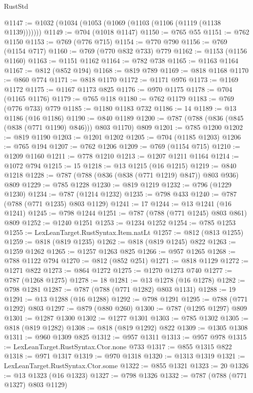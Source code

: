 \begin{lexlean}{RustStd}
\begin{coremodule}
@1147 := @1032 (@1034 (@1053 (@1069 (@1103 (@1106 (@1119 (@1138 @1139)))))))
@1149 := @704 (@1018 @1147)
@1150 := @765 @55
@1151 := @762 @1150
@1153 := @769 (@776 @715)
@1154 := @770 @790
@1156 := @769 (@1154 @717)
@1160 := @769 (@770 @832 @733) @779
@1162 := @1153 (@1156 @1160)
@1163 := @1151 @1162
@1164 := @782 @738
@1165 := @1163 @1164
@1167 := @812 (@852 @194)
@1168 := @819 @789
@1169 := @818 @1168
@1170 := @860 @774
@1171 := @818 @1170
@1172 := @1171 @976
@1173 := @1169 @1172
@1175 := @1167 @1173 @825
@1176 := @970 @1175
@1178 := @704 (@1165 @1176)
@1179 := @765 @118
@1180 := @762 @1179
@1183 := @769 (@776 @733) @779
@1185 := @1180 @1183 @732
@1186 := 14
@1189 := @13 @1186 (@16 @1186)
@1190 := @840 @1189
@1200 := @787 (@788 (@836 (@845 (@838 (@771 @1190) @846))) @803 @1170) @809
@1201 := @785 @1200
@1202 := @819 @1190
@1203 := @1201 @1202
@1205 := @704 (@1185 @1203)
@1206 := @765 @194
@1207 := @762 @1206
@1209 := @769 (@1154 @715)
@1210 := @1209 @1160
@1211 := @778 @1210
@1213 := @1207 @1211 @1164
@1214 := @1072 @794
@1215 := 15
@1218 := @13 @1215 (@16 @1215)
@1219 := @840 @1218
@1228 := @787 (@788 (@836 (@838 (@771 @1219) @847)) @803 @936) @809
@1229 := @785 @1228
@1230 := @819 @1219
@1232 := @796 (@1229 @1230)
@1234 := @787 (@1214 @1232)
@1235 := @798 @433
@1240 := @787 (@788 (@771 @1235) @803 @1129)
@1241 := 17
@1244 := @13 @1241 (@16 @1241)
@1245 := @798 @1244
@1251 := @787 (@788 (@771 @1245) @803 @861) @809
@1252 := @1240 @1251
@1253 := @1234 @1252
@1254 := @785 @1253
@1255 := LexLeanTarget.RustSyntax.Item.natLt
@1257 := @812 (@813 @1255)
@1259 := @818 (@819 @1235)
@1262 := @818 (@819 @1245) @822
@1263 := @1259 @1262
@1265 := @1257 @1263 @825
@1266 := @957 @1265
@1268 := @788 @1122 @794
@1270 := @812 (@852 @251)
@1271 := @818 @1129
@1272 := @1271 @822
@1273 := @864 @1272
@1275 := @1270 @1273 @740
@1277 := @787 (@1268 @1275)
@1278 := 18
@1281 := @13 @1278 (@16 @1278)
@1282 := @798 @1281
@1287 := @787 (@788 (@771 @1282) @803 @1131)
@1288 := 19
@1291 := @13 @1288 (@16 @1288)
@1292 := @798 @1291
@1295 := @788 (@771 @1292) @803
@1297 := @879 (@880 @260)
@1300 := @787 (@1295 @1297) @809
@1301 := @1287 @1300
@1302 := @1277 @1301
@1303 := @785 @1302
@1305 := @818 (@819 @1282)
@1308 := @818 (@819 @1292) @822
@1309 := @1305 @1308
@1311 := @960 @1309 @825
@1312 := @957 @1311
@1313 := @957 @978
@1315 := LexLeanTarget.RustSyntax.Ctor.none @733
@1317 := @855 @1315 @822
@1318 := @971 @1317
@1319 := @970 @1318
@1320 := @1313 @1319
@1321 := LexLeanTarget.RustSyntax.Ctor.some
@1322 := @855 @1321
@1323 := 20
@1326 := @13 @1323 (@16 @1323)
@1327 := @798 @1326
@1332 := @787 (@788 (@771 @1327) @803 @1129)

\end{coremodule}
\end{lexlean}
